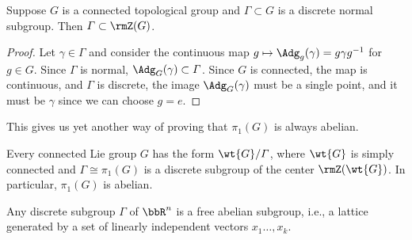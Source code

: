 \begin{prop}\label{prop discrete normal subgroup}
    Suppose $G$ is a connected topological group and $\varGamma\subset G$ is a discrete normal subgroup. Then $\varGamma\subset \rmZ(G)$.
\end{prop}
\begin{proof}
    Let $\gamma\in\varGamma$ and consider the continuous map $g\mapsto \Adg_g(\gamma)=g\gamma g^{-1}$ for $g\in G$. Since $\varGamma$ is normal, $\Adg_G(\gamma)\subset \varGamma$. Since $G$ is connected, the map is continuous, and $\varGamma$ is discrete, the image $\Adg_G(\gamma)$ must be a single point, and it must be $\gamma$ since we can choose $g=e$.
\end{proof}
This gives us yet another way of proving that $\pi_1(G)$ is always abelian.
\begin{cor}\label{cor G=wt G/Gamma}
    Every connected Lie group $G$ has the form $\wt{G}\slash\varGamma$, where $\wt{G}$ is simply connected and $\varGamma\cong \pi_1(G)$ is a discrete subgroup of the center $\rmZ(\wt{G})$. In particular, $\pi_1(G)$ is abelian.
\end{cor}
\begin{cor}\label{cor discrete subgroups of Rn}
    Any discrete subgroup $\varGamma$ of $\bbR^n$ is a free abelian subgroup, i.e., a lattice generated by a set of linearly independent vectors $x_1\ldots,x_k$.
\end{cor}

